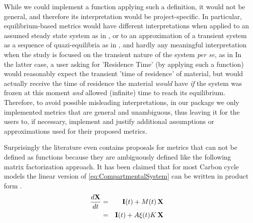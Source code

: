 While we could implement a function applying such a definition, it would not be general, and therefore its interpretation would be project-specific.
In particular, equilibrium-based metrics would have different interpretations when applied to an assumed steady state system as in \cite{Xia2013GCB}, or to an approximation of a transient system as a sequence of quazi-equilibria as in
\cite{Koven2015Biogeosciences, osullivan_process-oriented_2022}, and hardly any meaningful interpretation when the study is focused on the transient nature of the system \textit{per se}, as in \cite{Luo2017Biogeosciences} 
In the latter case, a user asking for 'Residence Time' (by applying such a function) would reasonably expect the transient 'time of residence' of material, but would actually receive the time of residence the material  
\emph{would} have \emph{if} the system was frozen at this moment \emph{and} allowed (infinite) time to reach its equilibrium. Therefore, to avoid possible misleading interpretations, in our package we only implemented metrics 
that are general and unambiguous, thus leaving it for the users to, if necessary, implement and justify additional assumptions or approximations used for their proposed metrics. 


Surprisingly the literature even contains proposals for metrics that can not be defined as functions because they are ambiguously defined like the following matrix factorization approach.  
It has been claimed that for most Carbon cycle models the linear version of \eqref{eq:CompartmentalSystem} can be written in product form 
\cite{Xia2013GCB, Luo2017Biogeosciences, zhou_sources_2018, zhou_traceability_2021, LiaoDisentangling2022,Luo2022, luo_land_2022}.
\begin{eqnarray} 
  \frac{d\mathbf{X}}{dt} &=& \mathbf{I}(t) + M(t) \, \mathbf{X} 
  \label{eq:LinCompartmentalSystem} 
  \\
                &=& \mathbf{I}(t) + A \xi(t) K \, \mathbf{X}
  \label{eq:AxiK}
\end{eqnarray}

